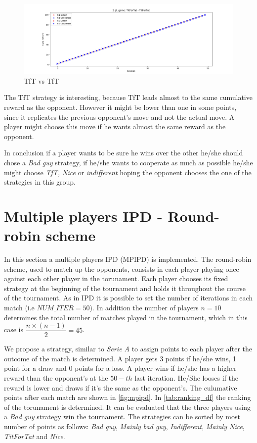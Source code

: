 \documentclass[journal,a4paper,10pt,twoside]{IEEEtran}
\begin{document}
\begin{figure}
    \centering
    \includegraphics[width=1\columnwidth]{../img_v1/idp2p-rewards-TitForTat-TitForTat.png}
    \caption{TfT vs TfT}
    \label{fig:tftvstft}
\end{figure}

The TfT strategy is interesting, because TfT leads almost to the same cumulative reward as the opponent. However it might be lower than one in some points, since it replicates the previous opponent's move and not the actual move. A player might choose this move if he wants almost the same reward as the opponent.

In conclusion if a player wants to be sure he wins over the other he/she should chose a \textit{Bad guy} strategy, if he/she wants to cooperate as much as possible he/she might choose \textit{TfT, Nice} or \textit{indifferent} hoping the opponent chooses the one of the strategies in this group.     

\newpage

\section{Multiple players IPD - Round-robin scheme} \label{IPDMP}
In this section a multiple players IPD (MPIPD) is implemented. The round-robin scheme, used to match-up the opponents, consists in each player playing once against each other player in the torunament.
Each player chooses its fixed strategy at the beginning of the tournament and holds it throughout the course of the tournament.
As in IPD it is possible to set the number of iterations in each match (i.e $NUM\_ITER = 50$). In addition the number of players $n = 10$ determines the total number of matches played in the tournament, which in this case is $\dfrac{n \times (n-1)}{2} = 45$.

We propose a strategy, similar to \textit{Serie A} to assign points to each player after the outcome of the match is determined. A player gets 3 points if he/she wins, 1 point for a draw and 0 points for a loss. A player wins if he/she has a higher reward than the opponent's at the $50-th$ last iteration. He/She looses if the reward is lower and draws if it's the same as the opponent's.
The culumative points after each match are shown in \autoref{fig:mpipd}.
In \autoref{tab:ranking_df} the ranking of the torunament is determined. It can be evaluated that the three players using a \textit{Bad guy} strategy win the tournament.
The strategies can be sorted by most number of points as follows: \textit{Bad guy}, \textit{Mainly bad guy}, \textit{Indifferent}, \textit{Mainly Nice}, \textit{TitForTat} and \textit{Nice}.
\end{document}
